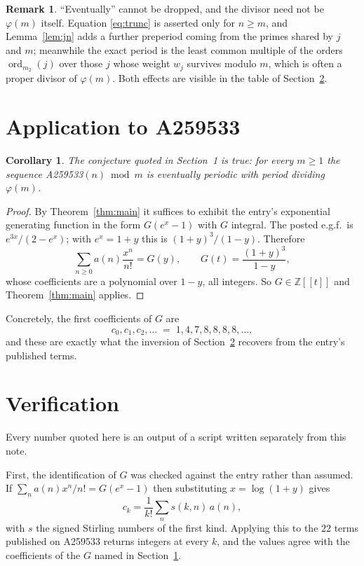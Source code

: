 \documentclass[11pt,a4paper]{article}
\theoremstyle{plain}
\newtheorem{corollary}[theorem]{Corollary}
\theoremstyle{definition}
\newtheorem{remark}[theorem]{Remark}
\newcommand{\ord}{\operatorname{ord}}
\newcommand{\Z}{\mathbb{Z}}
\begin{document}
\begin{remark}
``Eventually'' cannot be dropped, and the divisor need not be $\varphi(m)$ itself.
Equation \eqref{eq:trunc} is asserted only for $n\ge m$, and Lemma~\ref{lem:jn} adds a
further preperiod coming from the primes shared by $j$ and $m$; meanwhile the exact period
is the least common multiple of the orders $\ord_{m_{2}}(j)$ over those $j$ whose weight
$w_{j}$ survives modulo $m$, which is often a proper divisor of $\varphi(m)$. Both effects
are visible in the table of Section~\ref{sec:ver}.
\end{remark}

\section{Application to A259533}\label{sec:apply}

\begin{corollary}\label{cor:this}
The conjecture quoted in Section~1 is true: for every $m\ge1$ the sequence
A259533$(n) \bmod m$ is eventually periodic with period dividing $\varphi(m)$.
\end{corollary}

\begin{proof}
By Theorem~\ref{thm:main} it suffices to exhibit the entry's exponential generating
function in the form $G(e^{x}-1)$ with $G$ integral. The posted e.g.f.\ is $e^{3x}/(2-e^{x})$; with $e^{x}=1+y$ this is $(1+y)^{3}/(1-y)$. Therefore
\[
\sum_{n\ge0}a(n)\frac{x^{n}}{n!}=G(y),\qquad G(t)=\frac{(1+y)^{3}}{1-y} ,
\]
whose coefficients are a polynomial over $1-y$, all integers. So $G\in\Z[[t]]$ and
Theorem~\ref{thm:main} applies.
\end{proof}

Concretely, the first coefficients of $G$ are
\[
c_{0},c_{1},c_{2},\dots \;=\; 1, 4, 7, 8, 8, 8, 8, \dots ,
\]
and these are exactly what the inversion of Section~\ref{sec:ver} recovers from the
entry's published terms.

\section{Verification}\label{sec:ver}

Every number quoted here is an output of a script written separately from this note.

First, the identification of $G$ was checked against the entry rather than assumed. If
$\sum_{n}a(n)x^{n}/n!=G(e^{x}-1)$ then substituting $x=\log(1+y)$ gives
\[
c_{k}=\frac{1}{k!}\sum_{n}s(k,n)\,a(n),
\]
with $s$ the signed Stirling numbers of the first kind. Applying this to the
$22$ terms published on A259533 returns integers at every $k$, and the values
agree with the coefficients of the $G$ named in Section~\ref{sec:apply}.
\end{document}
